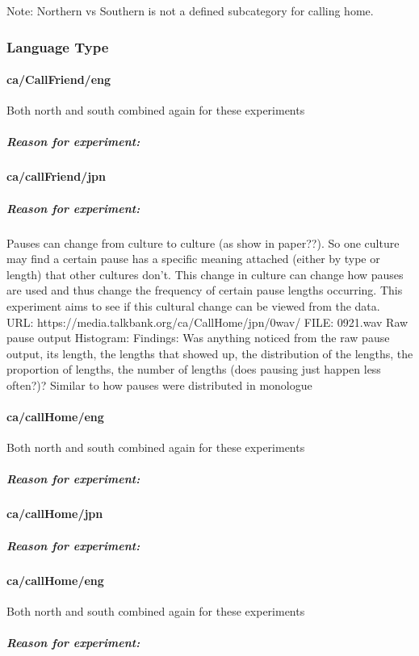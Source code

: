 Note: Northern vs Southern is not a defined subcategory for calling home. 

\subsubsection{Language Type}
\paragraph{ca/CallFriend/eng} Both north and south combined again for these experiments
\subparagraph{Reason for experiment:} 

\paragraph{ca/callFriend/jpn}
\subparagraph{Reason for experiment:} Pauses can change from culture to culture (as show in paper??). So one culture may find a certain pause has a specific meaning attached (either by type or length) that other cultures don't. This change in culture can change how pauses are used and thus change the frequency of certain pause lengths occurring. This experiment aims to see if this cultural change can be viewed from the data. \\
URL: https://media.talkbank.org/ca/CallHome/jpn/0wav/
FILE: 0921.wav
Raw pause output
Histogram: 
Findings: Was anything noticed from the raw pause output, its length, the lengths that showed up, the distribution of the lengths, the proportion of lengths, the number of lengths (does pausing just happen less often?)? Similar to how pauses were distributed in monologue 

\paragraph{ca/callHome/eng} Both north and south combined again for these experiments
\subparagraph{Reason for experiment:} 

\paragraph{ca/callHome/jpn}
\subparagraph{Reason for experiment:} 

\paragraph{ca/callHome/eng} Both north and south combined again for these experiments
\subparagraph{Reason for experiment:} 


